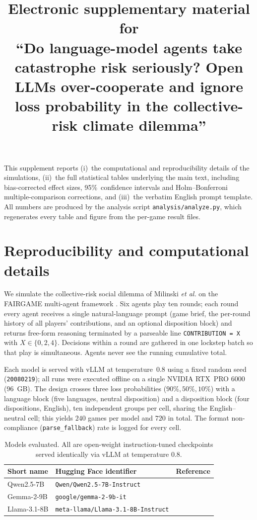 \documentclass[11pt]{article}
\title{Electronic supplementary material for\\[2pt]
\large ``Do language-model agents take catastrophe risk seriously? Open LLMs
over-cooperate and ignore loss probability in the collective-risk climate dilemma''}
\author{}
\date{}
\begin{document}
\maketitle

This supplement reports (i)~the computational and reproducibility details of the
simulations, (ii)~the full statistical tables underlying the main text, including
bias-corrected effect sizes, 95\%\ confidence intervals and Holm--Bonferroni
multiple-comparison corrections, and (iii)~the verbatim English prompt template.
All numbers are produced by the analysis script \texttt{analysis/analyze.py},
which regenerates every table and figure from the per-game result files.

\section{Reproducibility and computational details}

We simulate the collective-risk social dilemma of Milinski \textit{et al.}
\cite{milinski2008climate} on the FAIRGAME multi-agent framework
\cite{fairgame2025}. Six agents play ten rounds; each round every agent receives
a single natural-language prompt (game brief, the per-round history of all
players' contributions, and an optional disposition block) and returns free-form
reasoning terminated by a parseable line \texttt{CONTRIBUTION = X} with
$X\in\{0,2,4\}$. Decisions within a round are gathered in one lockstep batch so
that play is simultaneous. Agents never see the running cumulative total.

Each model is served with vLLM at temperature~$0.8$ using a fixed random seed
(\texttt{20080219}); all runs were executed offline on a single NVIDIA RTX~PRO
6000 (96~GB). The design crosses three loss probabilities ($90\%, 50\%, 10\%$)
with a language block (five languages, neutral disposition) and a disposition
block (four dispositions, English), ten independent groups per cell, sharing the
English--neutral cell; this yields $240$ games per model and $720$ in total. The
format non-compliance (\texttt{parse\_fallback}) rate is logged for every cell.

\begin{table}[h]\centering
\caption{Models evaluated. All are open-weight instruction-tuned checkpoints
served identically via vLLM at temperature $0.8$.}
\label{tab:si_models}
\begin{tabular}{lll}
\toprule
Short name & Hugging Face identifier & Reference \\
\midrule
Qwen2.5-7B   & \texttt{Qwen/Qwen2.5-7B-Instruct}       & \cite{qwen2025} \\
Gemma-2-9B   & \texttt{google/gemma-2-9b-it}           & \cite{gemma2024} \\
Llama-3.1-8B & \texttt{meta-llama/Llama-3.1-8B-Instruct}& \cite{llama2024} \\
\bottomrule
\end{tabular}
\end{table}
\end{document}
